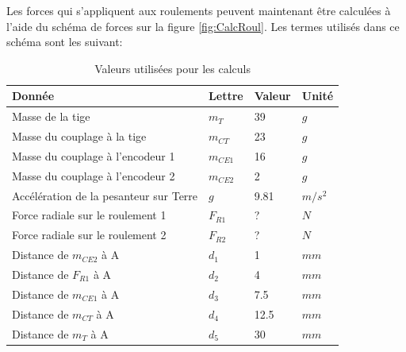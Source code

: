 Les forces qui s'appliquent aux roulements peuvent maintenant être calculées à l'aide du schéma de forces sur la figure \ref{fig:CalcRoul}.
Les termes utilisés dans ce schéma sont les suivant:

\begin{table}[H]
    \centering
    \caption{Valeurs utilisées pour les calculs}
    \label{tab:ValCalcRoul}
    \begin{tabular}{|l|l|l|l|}
        \hline
        \textbf{Donnée}                        & \textbf{Lettre} & \textbf{Valeur} & \textbf{Unité} \\ \hline
        Masse de la tige                       & $m_T$           & 39              & $g$            \\ \hline
        Masse du couplage à la tige            & $m_{CT}$        & 23              & $g$            \\ \hline
        Masse du couplage à l'encodeur 1       & $m_{CE1}$       & 16              & $g$            \\ \hline
        Masse du couplage à l'encodeur 2       & $m_{CE2}$       & 2               & $g$            \\ \hline
        Accélération de la pesanteur sur Terre & $g$             & 9.81            & $m/s^2$        \\ \hline
        Force radiale sur le roulement 1       & $F_{R1}$        & ?               & $N$            \\ \hline
        Force radiale sur le roulement 2       & $F_{R2}$        & ?               & $N$            \\ \hline
        Distance de $m_{CE2}$ à A              & $d_1$           & 1               & $mm$           \\ \hline
        Distance de $F_{R1}$ à A               & $d_2$           & 4               & $mm$           \\ \hline
        Distance de $m_{CE1}$ à A              & $d_3$           & 7.5             & $mm$           \\ \hline
        Distance de $m_{CT}$ à A               & $d_4$           & 12.5            & $mm$           \\ \hline
        Distance de $m_{T}$ à A                & $d_5$           & 30              & $mm$           \\ \hline
    \end{tabular}%
\end{table}

